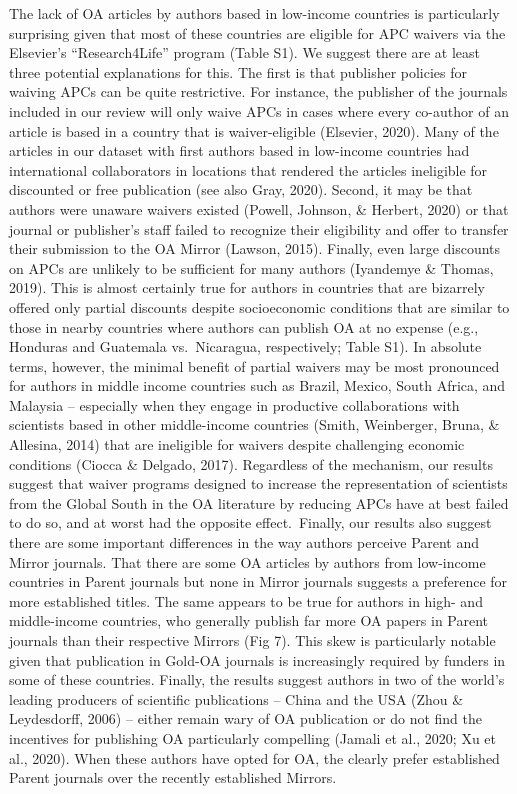 \documentclass[
  english,
  man]{apa6}
\begin{document}
The lack of OA articles by authors based in low-income countries is particularly surprising given that most of these countries are eligible for APC waivers via the Elsevier's ``Research4Life'' program (Table S1). We suggest there are at least three potential explanations for this. The first is that publisher policies for waiving APCs can be quite restrictive. For instance, the publisher of the journals included in our review will only waive APCs in cases where every co-author of an article is based in a country that is waiver-eligible (Elsevier, 2020). Many of the articles in our dataset with first authors based in low-income countries had international collaborators in locations that rendered the articles ineligible for discounted or free publication (see also Gray, 2020). Second, it may be that authors were unaware waivers existed (Powell, Johnson, \& Herbert, 2020) or that journal or publisher's staff failed to recognize their eligibility and offer to transfer their submission to the OA Mirror (Lawson, 2015). Finally, even large discounts on APCs are unlikely to be sufficient for many authors (Iyandemye \& Thomas, 2019). This is almost certainly true for authors in countries that are bizarrely offered only partial discounts despite socioeconomic conditions that are similar to those in nearby countries where authors can publish OA at no expense (e.g., Honduras and Guatemala vs.~Nicaragua, respectively; Table S1). In absolute terms, however, the minimal benefit of partial waivers may be most pronounced for authors in middle income countries such as Brazil, Mexico, South Africa, and Malaysia -- especially when they engage in productive collaborations with scientists based in other middle-income countries (Smith, Weinberger, Bruna, \& Allesina, 2014) that are ineligible for waivers despite challenging economic conditions (Ciocca \& Delgado, 2017). Regardless of the mechanism, our results suggest that waiver programs designed to increase the representation of scientists from the Global South in the OA literature by reducing APCs have at best failed to do so, and at worst had the opposite effect.~Finally, our results also suggest there are some important differences in the way authors perceive Parent and Mirror journals. That there are some OA articles by authors from low-income countries in Parent journals but none in Mirror journals suggests a preference for more established titles. The same appears to be true for authors in high- and middle-income countries, who generally publish far more OA papers in Parent journals than their respective Mirrors (Fig 7). This skew is particularly notable given that publication in Gold-OA journals is increasingly required by funders in some of these countries. Finally, the results suggest authors in two of the world's leading producers of scientific publications -- China and the USA (Zhou \& Leydesdorff, 2006) -- either remain wary of OA publication or do not find the incentives for publishing OA particularly compelling (Jamali et al., 2020; Xu et al., 2020). When these authors have opted for OA, the clearly prefer established Parent journals over the recently established Mirrors.
\end{document}
